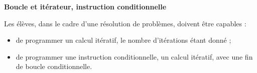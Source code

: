 \documentclass[10pt,openright,twoside]{book}
\begin{document}
\noindent\textbf{Boucle et itérateur, instruction conditionnelle}\par
Les élèves, dans le cadre d'une résolution de problèmes, doivent être capables :
\begin{itemize}
    \item de programmer un calcul itératif, le nombre d'itérations étant donné ;
    \item de programmer une instruction conditionnelle, un calcul itératif, avec une fin de boucle conditionnelle.
\end{itemize}
\end{document}
